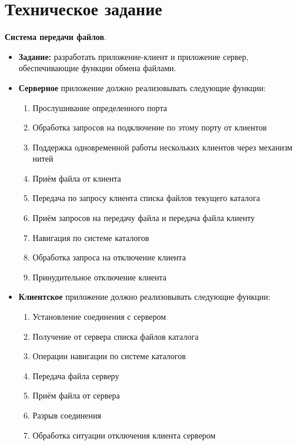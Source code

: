 





\tableofcontents
\newpage

\section{Техническое задание}


\textbf{Система передачи файлов}.

\begin{itemize}
	\item \textbf{Задание:} разработать приложение-клиент и приложение сервер, обеспечивающие функции обмена файлами.

	\item \textbf{Серверное} приложение должно реализовывать следующие функции:
	\begin{enumerate}
		\item Прослушивание определенного порта
		\item Обработка запросов на подключение по этому порту от клиентов
		\item Поддержка одновременной работы нескольких клиентов через механизм нитей
		\item Приём файла от клиента
		\item Передача по запросу клиента списка файлов текущего каталога
		\item Приём запросов на передачу файла и передача файла клиенту
		\item Навигация по системе каталогов
		\item Обработка запроса на отключение клиента
		\item Принудительное отключение клиента
	\end{enumerate}

	\item \textbf{Клиентское} приложение должно реализовывать следующие функции:
	\begin{enumerate}
		\item Установление соединения с сервером
		\item Получение от сервера списка файлов каталога
		\item Операции навигации по системе каталогов
		\item Передача файла серверу
		\item Приём файла от сервера
		\item Разрыв соединения
		\item Обработка ситуации отключения клиента сервером
	\end{enumerate}


\end{itemize}
